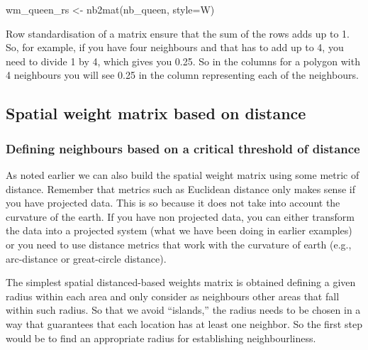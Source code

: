 \documentclass[
  krantz2]{krantz}
\makeatletter
\newenvironment{Shaded}{\begin{snugshade}}{\end{snugshade}}
\newcommand{\AttributeTok}[1]{\textcolor[rgb]{0.61,0.61,0.61}{#1}}
\newcommand{\FunctionTok}[1]{\textcolor[rgb]{0,0,0}{#1}}
\newcommand{\NormalTok}[1]{#1}
\newcommand{\OtherTok}[1]{\textcolor[rgb]{0.37,0.37,0.37}{#1}}
\newcommand{\StringTok}[1]{\textcolor[rgb]{0.5,0.5,0.5}{#1}}
\newenvironment{kframe}{%
\medskip{}
\setlength{\fboxsep}{.8em}
 \def\at@end@of@kframe{}%
 \ifinner\ifhmode%
  \def\at@end@of@kframe{\end{minipage}}%
  \begin{minipage}{\columnwidth}%
 \fi\fi%
 \def\FrameCommand##1{\hskip\@totalleftmargin \hskip-\fboxsep
 \colorbox{shadecolor}{##1}\hskip-\fboxsep
     \hskip-\linewidth \hskip-\@totalleftmargin \hskip\columnwidth}%
 \MakeFramed {\advance\hsize-\width
   \@totalleftmargin\z@ \linewidth\hsize
   \@setminipage}}%
 {\par\unskip\endMakeFramed%
 \at@end@of@kframe}
\renewenvironment{Shaded}{\begin{kframe}}{\end{kframe}}
\makeatother
\begin{document}
\begin{Shaded}
\begin{Highlighting}[]
\NormalTok{wm\_queen\_rs }\OtherTok{\textless{}{-}} \FunctionTok{nb2mat}\NormalTok{(nb\_queen, }\AttributeTok{style=}\StringTok{\textquotesingle{}W\textquotesingle{}}\NormalTok{)}
\end{Highlighting}
\end{Shaded}

Row standardisation of a matrix ensure that the sum of the rows adds up to 1. So, for example, if you have four neighbours and that has to add up to 4, you need to divide 1 by 4, which gives you 0.25. So in the columns for a polygon with 4 neighbours you will see 0.25 in the column representing each of the neighbours.

\hypertarget{spatial-weight-matrix-based-on-distance}{%
\subsection{Spatial weight matrix based on distance}\label{spatial-weight-matrix-based-on-distance}}

\hypertarget{defining-neighbours-based-on-a-critical-threshold-of-distance}{%
\subsubsection{Defining neighbours based on a critical threshold of distance}\label{defining-neighbours-based-on-a-critical-threshold-of-distance}}

As noted earlier we can also build the spatial weight matrix using some metric of distance. Remember that metrics such as Euclidean distance only makes sense if you have projected data. This is so because it does not take into account the curvature of the earth. If you have non projected data, you can either transform the data into a projected system (what we have been doing in earlier examples) or you need to use distance metrics that work with the curvature of earth (e.g., arc-distance or great-circle distance).

The simplest spatial distanced-based weights matrix is obtained defining a given radius within each area and only consider as neighbours other areas that fall within such radius. So that we avoid ``islands,'' the radius needs to be chosen in a way that guarantees that each location has at least one neighbor. So the first step would be to find an appropriate radius for establishing neighbourliness.
\end{document}
